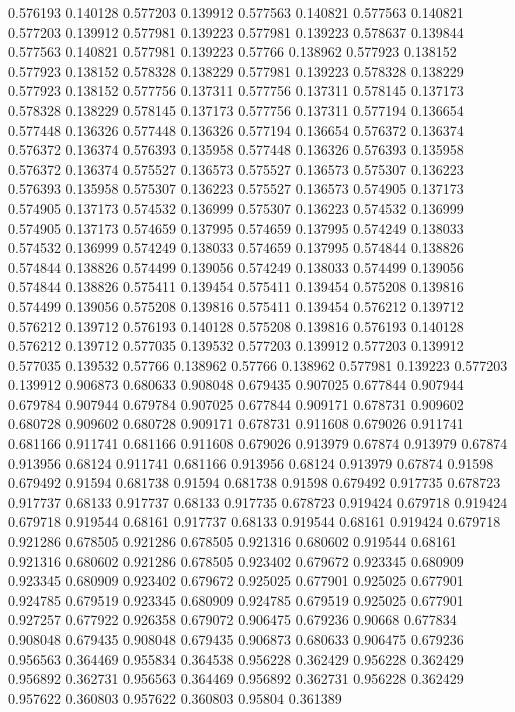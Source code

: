 0.576193 0.140128
0.577203 0.139912
0.577563 0.140821
0.577563 0.140821
0.577203 0.139912
0.577981 0.139223
0.577981 0.139223
0.578637 0.139844
0.577563 0.140821
0.577981 0.139223
0.57766 0.138962
0.577923 0.138152
0.577923 0.138152
0.578328 0.138229
0.577981 0.139223
0.578328 0.138229
0.577923 0.138152
0.577756 0.137311
0.577756 0.137311
0.578145 0.137173
0.578328 0.138229
0.578145 0.137173
0.577756 0.137311
0.577194 0.136654
0.577448 0.136326
0.577448 0.136326
0.577194 0.136654
0.576372 0.136374
0.576372 0.136374
0.576393 0.135958
0.577448 0.136326
0.576393 0.135958
0.576372 0.136374
0.575527 0.136573
0.575527 0.136573
0.575307 0.136223
0.576393 0.135958
0.575307 0.136223
0.575527 0.136573
0.574905 0.137173
0.574905 0.137173
0.574532 0.136999
0.575307 0.136223
0.574532 0.136999
0.574905 0.137173
0.574659 0.137995
0.574659 0.137995
0.574249 0.138033
0.574532 0.136999
0.574249 0.138033
0.574659 0.137995
0.574844 0.138826
0.574844 0.138826
0.574499 0.139056
0.574249 0.138033
0.574499 0.139056
0.574844 0.138826
0.575411 0.139454
0.575411 0.139454
0.575208 0.139816
0.574499 0.139056
0.575208 0.139816
0.575411 0.139454
0.576212 0.139712
0.576212 0.139712
0.576193 0.140128
0.575208 0.139816
0.576193 0.140128
0.576212 0.139712
0.577035 0.139532
0.577203 0.139912
0.577203 0.139912
0.577035 0.139532
0.57766 0.138962
0.57766 0.138962
0.577981 0.139223
0.577203 0.139912
0.906873 0.680633
0.908048 0.679435
0.907025 0.677844
0.907944 0.679784
0.907944 0.679784
0.907025 0.677844
0.909171 0.678731
0.909602 0.680728
0.909602 0.680728
0.909171 0.678731
0.911608 0.679026
0.911741 0.681166
0.911741 0.681166
0.911608 0.679026
0.913979 0.67874
0.913979 0.67874
0.913956 0.68124
0.911741 0.681166
0.913956 0.68124
0.913979 0.67874
0.91598 0.679492
0.91594 0.681738
0.91594 0.681738
0.91598 0.679492
0.917735 0.678723
0.917737 0.68133
0.917737 0.68133
0.917735 0.678723
0.919424 0.679718
0.919424 0.679718
0.919544 0.68161
0.917737 0.68133
0.919544 0.68161
0.919424 0.679718
0.921286 0.678505
0.921286 0.678505
0.921316 0.680602
0.919544 0.68161
0.921316 0.680602
0.921286 0.678505
0.923402 0.679672
0.923345 0.680909
0.923345 0.680909
0.923402 0.679672
0.925025 0.677901
0.925025 0.677901
0.924785 0.679519
0.923345 0.680909
0.924785 0.679519
0.925025 0.677901
0.927257 0.677922
0.926358 0.679072
0.906475 0.679236
0.90668 0.677834
0.908048 0.679435
0.908048 0.679435
0.906873 0.680633
0.906475 0.679236
0.956563 0.364469
0.955834 0.364538
0.956228 0.362429
0.956228 0.362429
0.956892 0.362731
0.956563 0.364469
0.956892 0.362731
0.956228 0.362429
0.957622 0.360803
0.957622 0.360803
0.95804 0.361389
